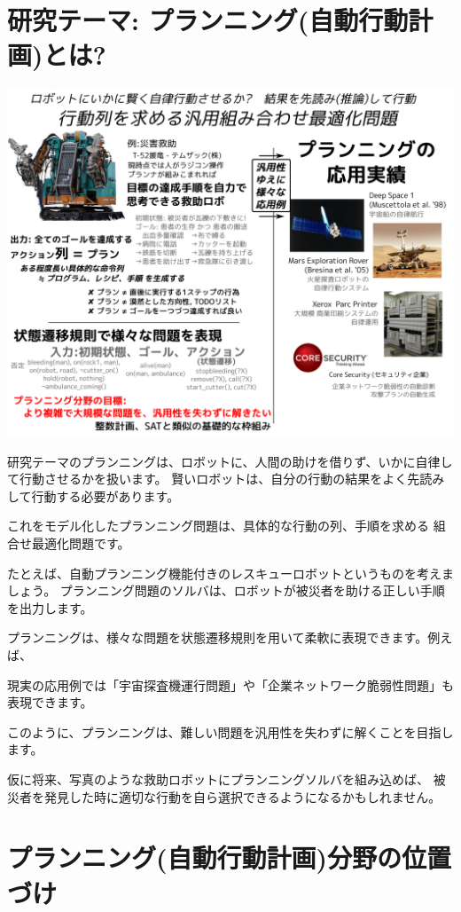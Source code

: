 \section{研究テーマ: プランニング(自動行動計画)とは?}
\label{sec-1}



\includegraphics{img/planning.png}

\begin{resume}
研究テーマのプランニングは、ロボットに、人間の助けを借りず、いかに自律して行動させるかを扱います。
賢いロボットは、自分の行動の結果をよく先読みして行動する必要があります。

これをモデル化したプランニング問題は、具体的な行動の列、手順を求める 組合せ最適化問題です。


たとえば、自動プランニング機能付きのレスキューロボットというものを考えましょう。
プランニング問題のソルバは、ロボットが被災者を助ける正しい手順を出力します。


プランニングは、様々な問題を状態遷移規則を用いて柔軟に表現できます。例えば、

現実の応用例では「宇宙探査機運行問題」や「企業ネットワーク脆弱性問題」も表現できます。

このように、プランニングは、難しい問題を汎用性を失わずに解くことを目指します。

仮に将来、写真のような救助ロボットにプランニングソルバを組み込めば、
被災者を発見した時に適切な行動を自ら選択できるようになるかもしれません。
\end{resume}

\section{プランニング(自動行動計画)分野の位置づけ}
\label{sec-2}

